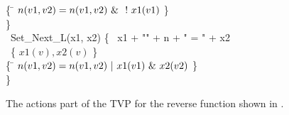 \begin{figure}
{\begin{minipage}{1in}
\begin{tabbing}
    \{  \= \+
        $n(v1, v2) = n(v1, v2) \tvand \tvneg x1(v1)$
  \-
    \}\-\\
\}\\
\actionI\  Set\_Next\_L(x1, x2) \{
    \tvtitle\  x1 + "\deref" + n + " = " + x2\\
    \focus\  \{ $x1(v), x2(v)$ \}\\
    \{  \= \+
        $n(v1, v2) = n(v1, v2) \tvor x1(v1) \tvand x2(v2)$
  \-
    \}\-\\
\}
\end{tabbing}
\end{minipage}
}
\caption{\label{Fi:ManRevActions}The actions part of the TVP for the reverse
function shown in .}
\end{figure}

